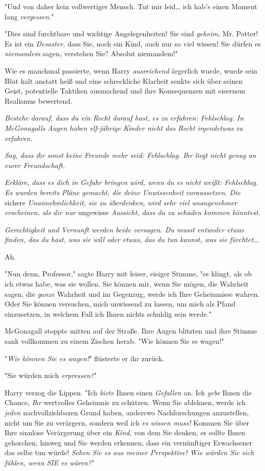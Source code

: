 {"Und von daher kein vollwertiger Mensch. Tut mir leid… ich hab's einen Moment lang \emph{vergessen.}"

"Dies sind furchtbare und wichtige Angelegenheiten! Sie sind \emph{geheim,} Mr. Potter! Es ist ein \emph{Desaster,} dass Sie, noch ein Kind, auch nur so viel wissen! Sie dürfen es \emph{niemandem} sagen, verstehen Sie? Absolut niemandem!"

Wie es manchmal passierte, wenn Harry \emph{ausreichend} ärgerlich wurde, wurde sein Blut kalt anstatt heiß und eine schreckliche Klarheit senkte sich über seinen Geist, potentielle Taktiken ausmachend und ihre Konsequenzen mit eisernem Realismus bewertend.

\emph{Bestehe darauf, dass du ein Recht darauf hast, es zu erfahren: Fehlschlag. In McGonagalls Augen haben elf-jährige Kinder nicht das Recht irgendetwas zu erfahren.}

\emph{Sag, dass ihr sonst keine Freunde mehr seid: Fehlschlag. Ihr liegt nicht genug an eurer Freundschaft.}

\emph{Erkläre, dass es dich in Gefahr bringen wird, wenn du es nicht weißt: Fehlschlag. Es wurden bereits Pläne gemacht, die deine Unwissenheit voraussetzen. Die} sichere \emph{Unannehmlichkeit, sie zu überdenken, wird sehr viel unangenehmer erscheinen, als die nur} ungewisse \emph{Aussicht, dass du zu schaden kommen könntest.}

\emph{Gerechtigkeit und Vernunft werden beide versagen. Du musst entweder etwas finden, das du hast, was sie will oder etwas, das du tun kannst, was sie fürchtet…}

Ah.

"Nun denn, Professor," sagte Harry mit leiser, eisiger Stimme, "es klingt, als ob ich etwas habe, was sie wollen. Sie können mir, wenn Sie mögen, die Wahrheit sagen, die \emph{ganze} Wahrheit und im Gegenzug, werde ich Ihre Geheimnisse wahren. Oder Sie können versuchen, mich unwissend zu lassen, um mich als Pfand einzusetzen, in welchem Fall ich Ihnen nichts schuldig sein werde."

McGonagall stoppte mitten auf der Straße. Ihre Augen blitzten und ihre Stimme sank vollkommen zu einem Zischen herab. "Wie können Sie es wagen!"

"\emph{Wie können Sie es wagen!}" flüsterte er ihr zurück.

"Sie würden mich \emph{erpressen?}"

Harry verzog die Lippen. "Ich \emph{biete} Ihnen einen \emph{Gefallen} an. Ich \emph{gebe} Ihnen die Chance, \emph{Ihr} wertvolles Geheimnis zu schützen. Wenn Sie ablehnen, werde ich \emph{jeden} nachvollziehbaren Grund haben, anderswo Nachforschungen anzustellen, nicht um Sie zu verärgern, sondern weil ich \emph{es wissen muss!} Kommen Sie über Ihre sinnlose Verärgerung über ein \emph{Kind}, von dem Sie denken, es sollte Ihnen gehorchen, hinweg und Sie werden erkennen, dass ein vernünftiger Erwachsener das selbe tun würde! \emph{Sehen Sie es aus meiner Perspektive! Wie würden Sie sich fühlen, wenn SIE es wären?}"

}

